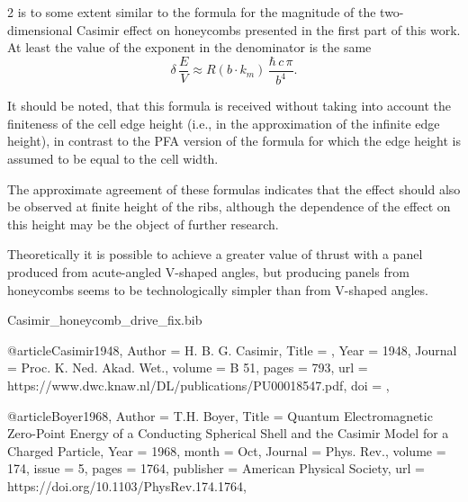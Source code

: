 \documentclass[twoside, 10pt]{article}
\def\myfilename{Casimir_honeycomb_drive_fix}
\begin{document}
\begin{multicols}{2}
is to some extent similar to the formula for the magnitude of the
two-dimensional Casimir effect on honeycombs presented in the first part
of this work. At least the value of the exponent in the denominator is
the same
\noindent
\begin{equation}\delta\,\frac{E}{V} \approx R\left(b \cdot k_m\right)\,\frac{\hbar\,c\,\pi}{b^4}.\end{equation}

It should be noted, that this formula is received without taking
into account the finiteness of the cell edge height (i.e., in
the approximation of the infinite edge height), in contrast to the PFA
version of the formula for which the edge height is assumed to be equal
to the cell width.

The approximate agreement of these formulas indicates that the
effect should also be observed at finite height of the ribs, although
the dependence of the effect on this height may be the object of further
research.

Theoretically it is possible to achieve a greater value of thrust with a
panel produced from acute-angled \mbox{V-shaped} angles, but producing
panels from honeycombs seems to be technologically simpler than
from \mbox{V-shaped} angles.


\begin{filecontents}{\myfilename.bib}


@article{Casimir1948,
    Author = {H. B. G. Casimir},
    Title = {},
    Year = {1948},
    Journal = {Proc. K. Ned. Akad. Wet.},
    volume = {B 51},
    pages = {793},
    url = {https://www.dwc.knaw.nl/DL/publications/PU00018547.pdf},
    doi = {},
}


@article{Boyer1968,
    Author = {T.H. Boyer},
    Title = {Quantum Electromagnetic Zero-Point Energy of a Conducting Spherical Shell and the Casimir Model for a Charged Particle},
    Year = {1968},
    month = {Oct},
    Journal = {Phys. Rev.},
    volume = {174},
    issue = {5},
    pages = {1764},
    publisher = {American Physical Society},
    url = {https://doi.org/10.1103/PhysRev.174.1764},
}


\end{filecontents}
\end{multicols}
\end{document}
